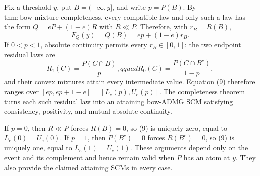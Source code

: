 Fix a threshold \(y\), put \(B=(-\infty,y]\), and write \(p=P(B)\).  By \(\mathrm{thm:bow\text{-}mixture\text{-}completeness}\), every compatible law and only such a law has the form \(Q=eP+(1-e)R\) with \(R\ll P\).  Therefore, with \(r_B=R(B)\),
\[
 F_Q(y)=Q(B)=ep+(1-e)r_B. \tag{9}
\]
If \(0<p<1\), absolute continuity permits every \(r_B\in[0,1]\): the two endpoint residual laws are
\[
 R_1(C)=\frac{P(C\cap B)}{p},qquad
 R_0(C)=\frac{P(C\cap B^c)}{1-p},
\]
and their convex mixtures attain every intermediate value.  Equation (9) therefore ranges over \([ep,ep+1-e]=[L_e(p),U_e(p)]\).  The completeness theorem turns each such residual law into an attaining bow-ADMG SCM satisfying consistency, positivity, and mutual absolute continuity.

If \(p=0\), then \(R\ll P\) forces \(R(B)=0\), so (9) is uniquely zero, equal to \(L_e(0)=U_e(0)\).  If \(p=1\), then \(P(B^c)=0\) forces \(R(B^c)=0\), so (9) is uniquely one, equal to \(L_e(1)=U_e(1)\).  These arguments depend only on the event and its complement and hence remain valid when \(P\) has an atom at \(y\).  They also provide the claimed attaining SCMs in every case.